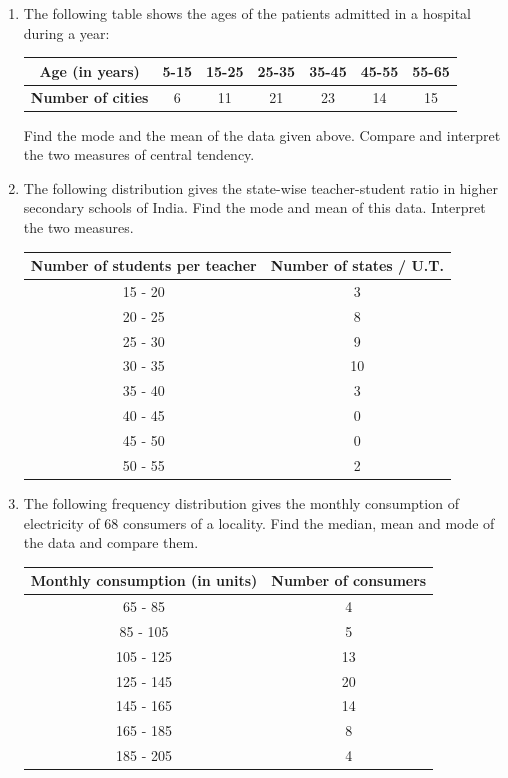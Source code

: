 \begin{enumerate}
\item The following table shows the ages of the patients admitted in a hospital during a year:

\vspace{2mm}
\begin{center}
 \begin{tabular}{|c|c|c|c|c|c|c|}
  \hline
  \textbf{Age (in years)} & 5-15 & 15-25 & 25-35 & 35-45 & 45-55 & 55-65 \\
  \hline
  \textbf{Number of cities} & 6 & 11 & 21 & 23 & 14 & 15 \\
  \hline
 \end{tabular}
\end{center}
Find the mode and the mean of the data given above. Compare and interpret the two
measures of central tendency.

\item The following distribution gives the state-wise teacher-student ratio in higher
secondary schools of India. Find the mode and mean of this data. Interpret the two
measures.

\vspace{2mm}
\begin{center}
 \begin{tabular}{|c|c|}
  \hline
  \textbf{Number of students per teacher} & \textbf{Number of states / U.T.} \\
  \hline
   15 - 20 & 3 \\
   20 - 25 & 8 \\
  25 - 30 & 9 \\
  30 - 35 & 10 \\
  35 - 40 & 3 \\
  40 - 45 & 0 \\
  45 - 50 & 0 \\
  50 - 55 & 2 \\
  \hline
 \end{tabular}
\end{center}



\item The following frequency distribution gives the monthly consumption of electricity of
68 consumers of a locality. Find the median, mean and mode of the data and compare
them.

\vspace{2mm}
\begin{center}
 \begin{tabular}{|c|c|}
  \hline
  \textbf{Monthly consumption (in units)} & \textbf{Number of consumers} \\
  \hline
   65 - 85 & 4 \\
   85 - 105 & 5 \\
  105 - 125 & 13 \\
  125 - 145 & 20 \\
  145 - 165 & 14 \\
  165 - 185 & 8 \\
  185 - 205 & 4 \\
   \hline
 \end{tabular}
\end{center}







\end{enumerate}

